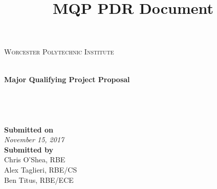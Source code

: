 \documentclass[letterpaper,12pt,titlepage]{article}
\title{MQP PDR Document}
\begin{document}
\begin{titlepage}
\begin{center}
\begin{minipage}{0.4\textwidth}
\end{minipage}
\begin{minipage}{0.5\textwidth}
\centering
\textsc{Worcester Polytechnic Institute}
\end{minipage}
\\ 
\vspace*{1cm}
	\Huge
	\textbf{Major Qualifying Project Proposal}\\
\vspace{1cm}
	\LARGE
	\\
\vspace{2cm}
	\Large
	\text{}\\
    \textbf{}\\
    \textbf{}\\
\vfill
\vspace{0.8cm}
	\LARGE
	\textbf{Submitted on} \\
    \Large
	\textit{November 15, 2017} \\
    
\vspace{0.8cm}
	\LARGE
	\textbf{Submitted by} \\
    \Large
	Chris O'Shea, RBE\\
	\Large
    Alex Taglieri, RBE/CS \\
	\Large
    Ben Titus, RBE/ECE \\
    
\vfill
\end{center}
\end{titlepage}

\newpage
  \tableofcontents
\newpage







% 
% 
% 

\pagebreak
{}

% 
% 

\appendices
% 

\end{document}
